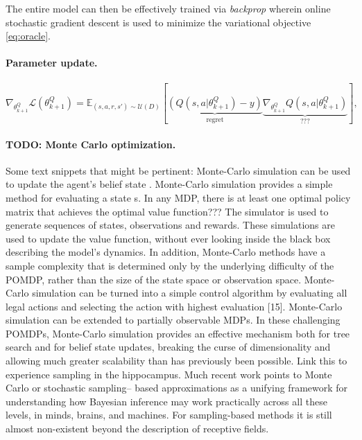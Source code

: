 \documentclass{article} %
\begin{document}
The entire model can then be effectively trained via \textit{backprop}
wherein online stochastic gradient descent is used to minimize the
variational objective \eqref{eq:oracle}.

\paragraph{Parameter update.}
\begin{equation}
  \nabla_{\theta^Q_{k+1}}\mathcal L(\theta^Q_{k+1})
  = \mathbb E_{(s, a, r, s') \sim \mathcal U(D)}\left[\underbrace{(Q(s, a|\theta^Q_{k+1}) - y)}_{\text{regret}}
    \underbrace{\nabla_{\theta^Q_{k+1}}Q(s, a|\theta^Q_{k+1})}_{\text{???}}\right],
  \label{eq:oracle}
\end{equation}

\paragraph{TODO: Monte Carlo optimization.}
Some text snippets that might be pertinent:
Monte-Carlo simulation can be used to update the agent’s belief state
\cite{silver2010monte}.
Monte-Carlo simulation provides a simple method for evaluating
a state s.
In any MDP, there is at least one optimal policy matrix that
achieves the optimal value function???
The simulator is used to generate sequences of states, observations and rewards. These simulations are used to update the value function, without ever looking inside the black box describing the model’s dynamics. In addition, Monte-Carlo methods have a sample complexity that is determined only by the underlying difficulty of the POMDP, rather than the size of the state space or observation space.
Monte-Carlo simulation can be turned into a simple control algorithm by evaluating all legal actions and selecting the action with highest evaluation [15]. Monte-Carlo simulation can be extended to partially observable MDPs.
In these challenging POMDPs, Monte-Carlo simulation provides an effective mechanism both for tree search and for belief state updates, breaking the curse of dimensionality and allowing much greater scalability than has previously been possible.
Link this to experience sampling in the hippocampus.
Much recent work points to Monte Carlo or stochastic sampling– based approximations as a unifying framework for understanding how Bayesian inference may work practically across all these levels, in minds, brains, and machines. 
For sampling-based methods it is still almost non-existent beyond the description of receptive fields. 
\end{document}
